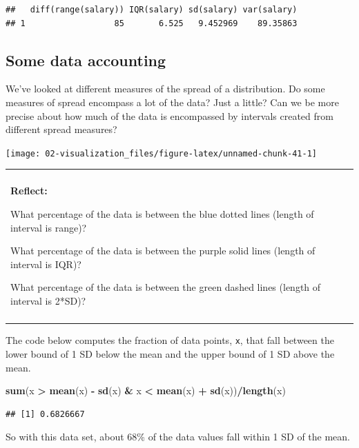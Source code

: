 \documentclass[
]{book}
\newenvironment{Shaded}{\begin{snugshade}}{\end{snugshade}}
\newcommand{\FunctionTok}[1]{\textcolor[rgb]{0.13,0.29,0.53}{\textbf{#1}}}
\newcommand{\NormalTok}[1]{#1}
\newcommand{\SpecialCharTok}[1]{\textcolor[rgb]{0.81,0.36,0.00}{\textbf{#1}}}
\newenvironment{reflect}
{
    \begin{center}
    
    \begin{tabular}{|p{0.8\textwidth}|}
    \rowcolor{LightBlue}
    \hline\\
    \rowcolor{LightBlue}
    \textbf{Reflect:}
}
{
    \\\rowcolor{LightBlue}
    \\\hline
    \end{tabular} 
    \end{center}
}
\begin{document}
\begin{verbatim}
##   diff(range(salary)) IQR(salary) sd(salary) var(salary)
## 1                  85       6.525   9.452969    89.35863
\end{verbatim}

\subsection{Some data accounting}\label{intro-zscore}

We've looked at different measures of the spread of a distribution. Do some measures of spread encompass a lot of the data? Just a little? Can we be more precise about how much of the data is encompassed by intervals created from different spread measures?

\begin{center}\texttt{[image: 02-visualization\_files/figure-latex/unnamed-chunk-41-1]} \end{center}

\begin{reflect}
What percentage of the data is between the blue dotted lines (length of
interval is range)?

What percentage of the data is between the purple solid lines (length of
interval is IQR)?

What percentage of the data is between the green dashed lines (length of
interval is 2*SD)?
\end{reflect}

The code below computes the fraction of data points, \texttt{x}, that fall between the lower bound of 1 SD below the mean and the upper bound of 1 SD above the mean.

\begin{Shaded}
\begin{Highlighting}[]
\FunctionTok{sum}\NormalTok{(x }\SpecialCharTok{\textgreater{}} \FunctionTok{mean}\NormalTok{(x) }\SpecialCharTok{{-}} \FunctionTok{sd}\NormalTok{(x) }\SpecialCharTok{\&}\NormalTok{ x }\SpecialCharTok{\textless{}} \FunctionTok{mean}\NormalTok{(x) }\SpecialCharTok{+} \FunctionTok{sd}\NormalTok{(x))}\SpecialCharTok{/}\FunctionTok{length}\NormalTok{(x)}
\end{Highlighting}
\end{Shaded}

\begin{verbatim}
## [1] 0.6826667
\end{verbatim}

So with this data set, about 68\% of the data values fall within 1 SD of the mean.
\end{document}
